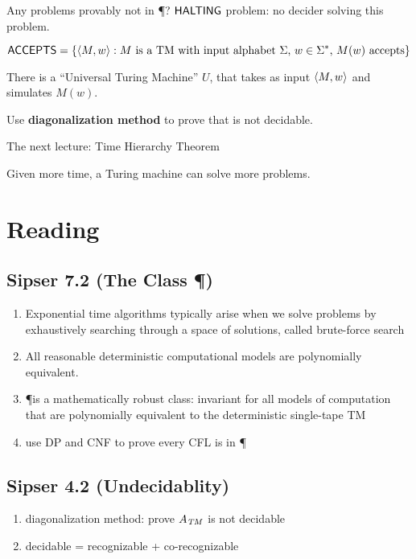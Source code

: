 \documentclass{article}
\begin{document}
Any problems provably not in \P? \(\text{\sf HALTING}\) problem: no decider solving this problem.

\begin{definition}
  \[ \text{\sf ACCEPTS} = \left\lbrace \left\langle M, w \right\rangle : \text{\(M\) is a TM with input alphabet \(\Sigma\), \(w \in \Sigma^*\), \(M(w)\) accepts} \right\rbrace \]
\end{definition}

\begin{fact}
  There is a ``Universal Turing Machine'' \(U\), that takes as input \(\left\langle M, w \right\rangle\) and simulates \(M(w)\).
\end{fact}

Use {\bf diagonalization method} to prove that  is not decidable.

The next lecture: Time Hierarchy Theorem

\begin{theorem}
  Given more time, a Turing machine can solve more problems.
\end{theorem}

\section{Reading}

\subsection{Sipser 7.2 (The Class \P)}

\begin{enumerate}
  \item Exponential time algorithms typically arise when we solve problems by exhaustively searching through a space of solutions, called brute-force search
  \item All reasonable deterministic computational models are polynomially equivalent.
  \item \P is a mathematically robust class: invariant for all models of computation that are polynomially equivalent to the deterministic single-tape TM
  \item use DP and CNF to prove every CFL is in \P
\end{enumerate}

\subsection{Sipser 4.2 (Undecidablity)}

\begin{enumerate}
  \item diagonalization method: prove \(A_{\it TM}\) is not decidable
  \item decidable = recognizable + co-recognizable
\end{enumerate}
\end{document}
